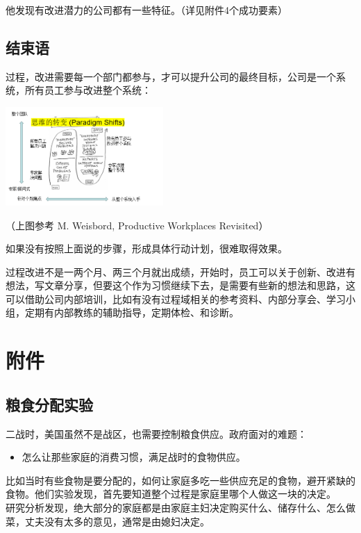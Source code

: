 他发现有改进潜力的公司都有一些特征。（详见附件4个成功要素）

\hypertarget{ux7ed3ux675fux8bed}{%
\subsection{结束语}\label{ux7ed3ux675fux8bed}}

过程，改进需要每一个部门都参与，才可以提升公司的最终目标，公司是一个系统，所有员工参与改进整个系统：


\includegraphics[width=6cm]{微信截图_20231025084623.png}

（上图参考 M. Weisbord, Productive Workplaces Revisited）

如果没有按照上面说的步骤，形成具体行动计划，很难取得效果。

过程改进不是一两个月、两三个月就出成绩，开始时，员工可以关于创新、改进有想法，写文章分享，但要这个作为习惯继续下去，是需要有些新的想法和思路，这可以借助公司内部培训，比如有没有过程域相关的参考资料、内部分享会、学习小组，定期有内部教练的辅助指导，定期体检、和诊断。

\hypertarget{ux9644ux4ef6}{%
\section{附件}\label{ux9644ux4ef6}}

\hypertarget{ux7caeux98dfux5206ux914dux5b9eux9a8c}{%
\subsection{粮食分配实验}\label{ux7caeux98dfux5206ux914dux5b9eux9a8c}}

二战时，美国虽然不是战区，也需要控制粮食供应。政府面对的难题：

\begin{itemize}
\tightlist
\item
  怎么让那些家庭的消费习惯，满足战时的食物供应。
\end{itemize}

比如当时有些食物是要分配的，如何让家庭多吃一些供应充足的食物，避开紧缺的食物。他们实验发现，首先要知道整个过程是家庭里哪个人做这一块的决定。\\
研究分析发现，绝大部分的家庭都是由家庭主妇决定购买什么、储存什么、怎么做菜，丈夫没有太多的意见，通常是由媳妇决定。

